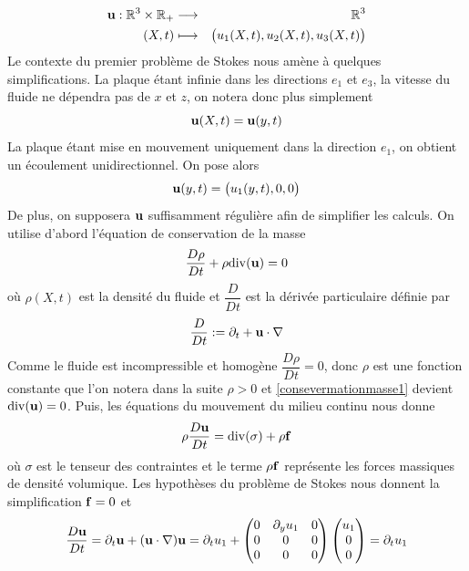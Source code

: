 \begin{eqnarray*}
    \bm{\mathrm{u}} : \mathbb{R}^3 \times \mathbb{R}_+ &\longrightarrow& \mathbb{R}^3 \\
    (X,t) &\longmapsto& \big(u_1(X,t), u_2(X,t), u_3(X,t)\big)
\end{eqnarray*}
Le contexte du premier problème de Stokes nous amène à quelques simplifications. La plaque étant infinie dans les directions $e_1$ et $e_3$, la vitesse du fluide ne dépendra pas de $x$ et $z$, on notera donc plus simplement
\begin{equation*}
    \bm{\mathrm{u}} (X,t) = \bm{\mathrm{u}} (y,t)
\end{equation*}
La plaque étant mise en mouvement uniquement dans la direction $e_1$, on obtient un écoulement unidirectionnel. On pose alors
\begin{equation*}
    \bm{\mathrm{u}} (y,t) = \big(u_1(y,t),0,0\big)
\end{equation*}
De plus, on supposera $\bm{\mathrm{u}}$ suffisamment régulière afin de simplifier les calculs. On utilise d'abord l'équation de conservation de la masse
\begin{equation}\label{consevermationmasse1}
    \frac{D\rho}{Dt} + \rho \mathrm{div}(\bm{\mathrm{u}}) = 0
\end{equation}
où $\rho(X,t)$ est la densité du fluide et $\dfrac{D}{Dt}$ est la dérivée particulaire définie par
\begin{equation*}
    \frac{D}{Dt} := \partial_t  +  \bm{\mathrm{u}} \cdot \nabla 
\end{equation*}
Comme le fluide est incompressible et homogène $\dfrac{D\rho}{Dt} = 0$, donc 
$\rho$ est une fonction constante que l'on notera dans la suite $\rho >0$ et \eqref{consevermationmasse1} devient $\mathrm{div}(\bm{\mathrm{u}})=0$. Puis, les équations du mouvement du milieu continu nous donne 
\begin{equation}\label{PFD1}
    \rho \frac{D\bm{\mathrm{u}}}{Dt} = \mathrm{div}(\sigma) + \rho \bm{\mathrm{f}}
\end{equation}
où $\sigma$ est le tenseur des contraintes et le terme $\rho\bm{\mathrm{f}}$ représente les forces massiques de densité volumique. Les hypothèses du problème de Stokes nous donnent la simplification $\bm{\mathrm{f}}=0$ et 
\begin{equation*}
    \frac{D\bm{\mathrm{u}}}{Dt} = \partial_t \bm{\mathrm{u}} + (\bm{\mathrm{u}} \cdot \nabla) \bm{\mathrm{u}} = \partial_t u_1 + \begin{pmatrix}
        0 & \partial_yu_1 & 0 \\
        0 & 0 & 0 \\
        0 & 0 & 0
    \end{pmatrix}\begin{pmatrix}
        u_1 \\ 0 \\ 0
    \end{pmatrix} = \partial_tu_1
\end{equation*}
